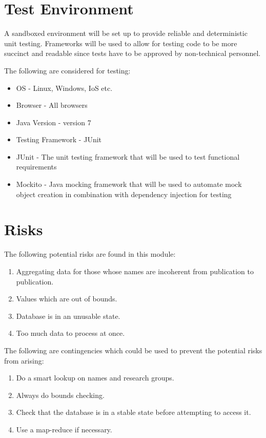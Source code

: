 \section{Test Environment}
\label{sec:testEnv}
A sandboxed environment will be set up to provide reliable and deterministic unit testing. Frameworks will be used to allow for testing code to be more succinct and readable since tests have to be approved by non-technical personnel.
\par The following are considered for testing:
\begin{itemize}
	\item OS - Linux, Windows, IoS etc.
	\item Browser - All browsers
	\item Java Version - version 7
	\item Testing Framework - JUnit
	\item JUnit - The unit testing framework that will be used to test functional requirements
	\item Mockito - Java mocking framework that will be used to automate mock object creation in combination with dependency injection for testing
\end{itemize}

\section{Risks}
\label{risks}
	The following potential risks are found in this module:
\begin{enumerate}
	\item Aggregating data for those whose names are incoherent from publication to publication.
	\item Values  which are out of bounds.
	\item Database is in an unusable state.
	\item Too much data to process at once.
\end{enumerate}

	The following are contingencies which could be used to prevent the potential risks from arising:
\begin{enumerate}

	\item Do a smart lookup on names and research groups.
	\item Always do bounds checking.
	\item Check that the database is in a stable state before attempting to access it.
	\item Use a map-reduce if necessary.


\end{enumerate}

